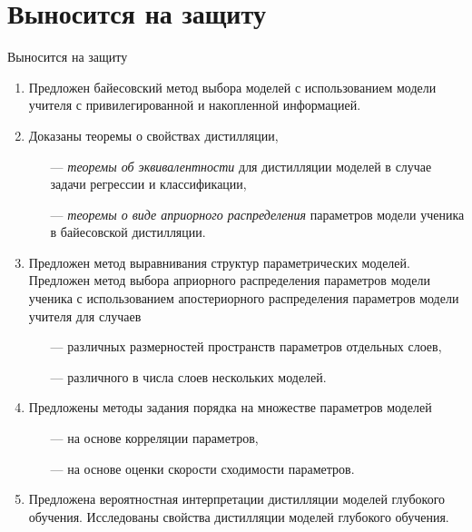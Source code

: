 \documentclass[10pt,pdf,hyperref={unicode}]{beamer}
\begin{document}
\section{Выносится на защиту}
\begin{frame}{Выносится на защиту}
\justifying
	\begin{enumerate}
	\justifying
	    \item Предложен байесовский метод выбора моделей с использованием модели учителя с привилегированной и накопленной информацией.
        \item Доказаны теоремы о свойствах дистилляции, 
        \begin{itemize}
            \item[---] \emph{теоремы об эквивалентности} для дистилляции моделей в случае задачи регрессии и классификации,
            \item[---] \emph{теоремы о виде априорного распределения} параметров модели ученика в байесовской дистилляции.
        \end{itemize}
        \item Предложен метод выравнивания структур параметрических моделей. Предложен метод выбора априорного распределения параметров модели ученика с использованием апостериорного распределения параметров модели учителя для случаев
        \begin{itemize}
            \item[---] различных размерностей пространств параметров отдельных слоев,
            \item[---] различного в числа слоев нескольких моделей.
        \end{itemize}
        \item Предложены методы задания порядка на множестве параметров моделей
        \begin{itemize}
            \item[---] на основе корреляции параметров,
            \item[---] на основе оценки скорости сходимости параметров.
        \end{itemize}
        \item Предложена вероятностная интерпретации дистилляции моделей глубокого обучения. Исследованы свойства дистилляции моделей глубокого обучения.
	\end{enumerate}
\end{frame}
\end{document}
